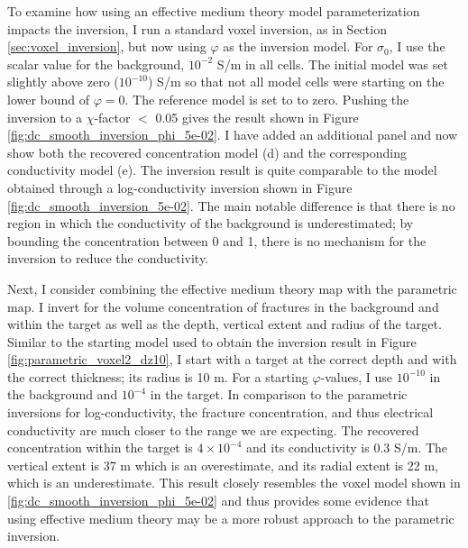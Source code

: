 

To examine how using an effective medium theory model parameterization impacts the inversion, I run a standard voxel inversion, as in Section \ref{sec:voxel_inversion}, but now using $\varphi$ as the inversion model. For $\sigma_0$, I use the scalar value for the background, $10^{-2}$ S/m in all cells. The initial model was set slightly above zero ($10^{-10}$) S/m so that not all model cells were starting on the lower bound of $\varphi=0$. The reference model is set to to zero. Pushing the inversion to a $\chi$-factor $<$ 0.05 gives the result shown in Figure \ref{fig:dc_smooth_inversion_phi_5e-02}. I have added an additional panel and now show both the recovered concentration model (d) and the corresponding conductivity model (e). The inversion result is quite comparable to the model obtained through a log-conductivity inversion shown in Figure \ref{fig:dc_smooth_inversion_5e-02}. The main notable difference is that there is no region in which the conductivity of the background is underestimated; by bounding the concentration between 0 and 1, there is no mechanism for the inversion to reduce the conductivity.




Next, I consider combining the effective medium theory map with the parametric map. I invert for the volume concentration of fractures in the background and within the target as well as the depth, vertical extent and radius of the target. Similar to the starting model used to obtain the inversion result in Figure \ref{fig:parametric_voxel2_dz10}, I start with a target at the correct depth and with the correct thickness; its radius is 10 m. For a starting $\varphi$-values, I use $10^{-10}$ in the background and $10^{-4}$ in the target. In comparison to the parametric inversions for log-conductivity, the fracture concentration, and thus electrical conductivity are much closer to the range we are expecting. The recovered concentration within the target is $4\times10^{-4}$ and its conductivity is 0.3 S/m. The vertical extent is 37 m which is an overestimate, and its radial extent is 22 m, which is an underestimate. This result closely resembles the voxel model shown in \ref{fig:dc_smooth_inversion_phi_5e-02} and thus provides some evidence that using effective medium theory may be a more robust approach to the parametric inversion.




